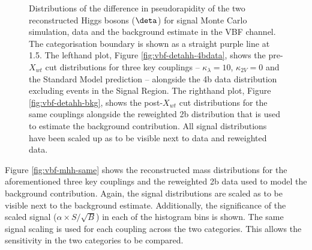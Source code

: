 \begin{figure}[h]
	\centering
	\caption{Distributions of the difference in pseudorapidity of the two reconstructed Higgs bosons ($\deta$) for signal Monte Carlo simulation, data and the background estimate in the VBF channel. The categorisation boundary is shown as a straight purple line at 1.5. The lefthand plot, Figure \ref{fig:vbf-detahh-4bdata}, shows the pre-$X_{wt}$ cut distributions for three key couplings -- $\kappa_{\lambda} = 10$, $\kappa_{2V} = 0$ and the Standard Model prediction -- alongside the 4b data distribution excluding events in the Signal Region. The righthand plot, Figure \ref{fig:vbf-detahh-bkg}, shows the post-$X_{wt}$ cut distributions for the same couplings alongside the reweighted 2b distribution that is used to estimate the background contribution. All signal distributions have been scaled up as to be visible next to data and reweighted data.}
	\label{fig:vbf-detahh}
\end{figure}

Figure \ref{fig:vbf-mhh-same} shows the reconstructed \HH mass distributions for the aforementioned three key couplings and the reweighted 2b data used to model the background contribution. Again, the signal distributions are scaled as to be visible next to the background estimate. Additionally, the significance of the scaled signal ($\alpha \times S/\sqrt{B}$) in each of the histogram bins is shown. The same signal scaling is used for each coupling across the two categories. This allows the sensitivity in the two categories to be compared. 

